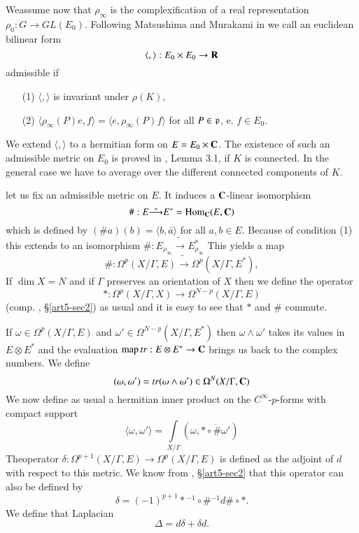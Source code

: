We\pageoriginale assume now that $\rho_\infty$ is the complexification of a real representation $\rho_0 : G \to G L (E_0)$. Following Matsushima and Murakami in \cite{art5-key10} we call an euclidean bilinear form
$$
\langle, \rangle : E_0 \times E_0 \to \mathbf{R}
$$
admissible if 
\begin{itemize}
\item[(1)] $\langle, \rangle$ is invariant under $\rho (K)$, 

\item[(2)] $\langle \rho_\infty (P) e, f \rangle = \langle e, \rho_\infty (P) f \rangle$ for all $P \in \mathfrak{p}$, e. $f \in E_0$.
\end{itemize}
We extend $\langle , \rangle$ to a hermitian form on $E = E_0 \times \mathbf{C}$. The existence of such an admissible metric on $E_0$ is proved in \cite{art5-key10}, Lemma 3.1, if $K$ is connected. In the general case we have to average over the different connected components of $K$.


let us fix an admissible metric on $E$. It induces a $\mathbf{C}$-linear isomorphism
$$
\# : E \tilde{\longrightarrow} E^\ast = \operatorname{Hom}_{\mathbf{C}} (E, \mathbf{C})
$$
which is defined by $(\# a) (b) = \langle b, \bar{a} \rangle$ for all $a, b \in E$. Because of condition (1) this extends to an isomorphism $\# : E_{\rho_\infty} \tilde{\longrightarrow} E^\ast_{\rho_\infty}$ This yields a map
\begin{equation}
\# : \Omega^p (X/ \Gamma, E) \tilde{\longrightarrow} \Omega^p (X/ \Gamma, E^\ast) , \label{art5-eq1.5}
\end{equation}
If $\dim X =N$ and if $\Gamma$ preserves an orientation of $X$ then we define the operator 
\begin{equation}
\ast : \Omega^p (X / \Gamma, X) \longrightarrow \Omega^{N-p} (X/ \Gamma, E) \label{art5-eq1.6}
\end{equation}
(comp. \cite{art5-key10}, \S \ref{art5-sec2}) as usual and it is easy to see that $\ast$ and $\#$ commute.

If $\omega \in \Omega^p (X / \Gamma , E)$ and $\omega' \in \Omega^{N-p} (X/ \Gamma, E^\ast)$ then $\omega \wedge \omega'$ takes its values in $E \otimes E^\ast$ and the evaluation $\operatorname{map} tr : E \otimes E^\ast \to \mathbf{C}$ brings us back to the complex numbers. We define
\begin{equation}
(\omega, \omega') = tr (\omega \wedge \omega') \in \Omega^N (X/ \Gamma, \mathbf{C})
\label{art5-eq1.7}
\end{equation}
We now define as usual a hermitian inner product on the $C^\infty$-$p$-forms with compact support
$$
\langle \omega, \omega' \rangle = \int\limits_{X/ \Gamma} (\omega, \overline{\ast \circ \# \omega'})
$$
The\pageoriginale operator $\delta: \Omega^{p+1} (X/ \Gamma, E) \to \Omega^p (X/ \Gamma, E)$  is defined as the adjoint of $d$ with respect to this metric. We know from \cite{art5-key10}, \S \ref{art5-sec2} that this operator can also be defined by 
$$
\delta = (-1)^{p+1} \ast {}^{-1} \circ \# {}^{-1} d \# \circ \ast .
$$
We define that Laplacian
$$
\Delta = d \delta + \delta d.
$$

